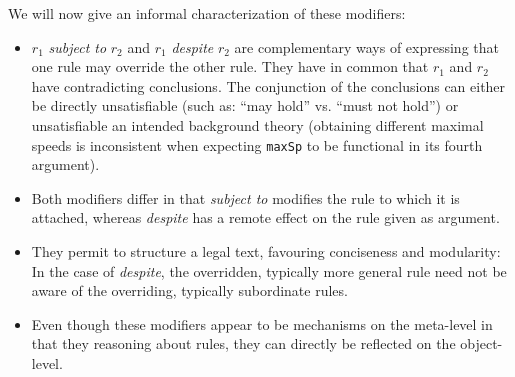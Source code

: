 We will now give an informal characterization of these modifiers:
\begin{itemize}
\item $r_1$ \emph{subject to} $r_2$ and $r_1$ \emph{despite} $r_2$ are complementary
  ways of expressing that one rule may override the other rule. They have in
  common that $r_1$ and $r_2$ have contradicting conclusions. The conjunction
  of the conclusions can either be directly unsatisfiable (such as: ``may hold'' vs.{}
  ``must not hold'') or unsatisfiable \wrt{} an intended background theory
  (obtaining different maximal speeds is inconsistent when expecting
  \texttt{maxSp} to be functional in its fourth argument).
\item Both modifiers differ in that \emph{subject to} modifies the rule to which
  it is attached, whereas \emph{despite} has a remote effect on the rule given
  as argument.
\item They permit to structure a legal text, favouring conciseness and
  modularity: In the case of \emph{despite}, the overridden, typically more
  general rule need not be aware of the overriding, typically subordinate rules.
\item Even though these modifiers appear to be mechanisms on the meta-level in
  that they reasoning about rules, they can directly be reflected on the
  object-level.
\end{itemize}

